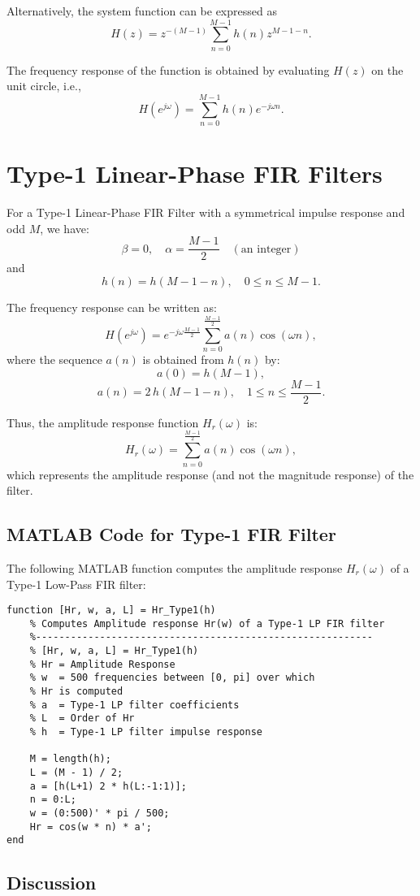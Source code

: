 \documentclass[a4paper,12pt]{article}
\begin{document}
Alternatively, the system function can be expressed as
\[
H(z) = z^{-(M-1)} \sum_{n=0}^{M-1} h(n)z^{M-1-n}.
\]

The frequency response of the function is obtained by evaluating \(H(z)\) on the unit circle, i.e.,
\[
H(e^{j\omega}) = \sum_{n=0}^{M-1} h(n)e^{-j\omega n}.
\]
\section{ Type-1 Linear-Phase FIR Filters}

For a Type-1 Linear-Phase FIR Filter with a symmetrical impulse response and odd \(M\), we have:
\[
\beta = 0,\quad \alpha = \frac{M-1}{2} \quad (\text{an integer})
\]
and
\[
h(n) = h(M-1-n),\quad 0 \leq n \leq M-1.
\]

The frequency response can be written as:
\[
H(e^{j\omega}) = e^{-j\omega\frac{M-1}{2}} \sum_{n=0}^{\frac{M-1}{2}} a(n)\cos(\omega n),
\]
where the sequence \(a(n)\) is obtained from \(h(n)\) by:
\[
a(0) = h(M-1),
\]
\[
a(n) = 2\,h(M-1-n),\quad 1 \leq n \leq \frac{M-1}{2}.
\]

Thus, the amplitude response function \(H_r(\omega)\) is:
\[
H_r(\omega) = \sum_{n=0}^{\frac{M-1}{2}} a(n)\cos(\omega n),
\]
which represents the amplitude response (and not the magnitude response) of the filter.

\subsection{MATLAB Code for Type-1 FIR Filter}

The following MATLAB function computes the amplitude response \(H_r(\omega)\) of a Type-1 Low-Pass FIR filter:

\begin{verbatim}
function [Hr, w, a, L] = Hr_Type1(h)
    % Computes Amplitude response Hr(w) of a Type-1 LP FIR filter
    %----------------------------------------------------------
    % [Hr, w, a, L] = Hr_Type1(h)
    % Hr = Amplitude Response
    % w  = 500 frequencies between [0, pi] over which
    % Hr is computed
    % a  = Type-1 LP filter coefficients
    % L  = Order of Hr
    % h  = Type-1 LP filter impulse response

    M = length(h);
    L = (M - 1) / 2;
    a = [h(L+1) 2 * h(L:-1:1)];
    n = 0:L;
    w = (0:500)' * pi / 500;
    Hr = cos(w * n) * a';
end
\end{verbatim}

\subsection{Discussion}
\end{document}
